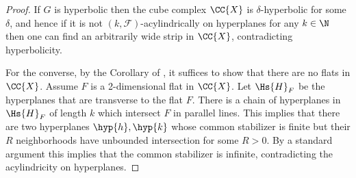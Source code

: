 \begin{proof}
	If $G$ is hyperbolic then the cube complex $\CC{X}$ is $\delta$-hyperbolic for some $\delta$, and hence if it is not $(k,\mathcal{F})$-acylindrically on hyperplanes for any $k\in\N$ then one can find an arbitrarily wide strip in $\CC{X}$, contradicting hyperbolicity.
	
	For the converse, by the Corollary of \cite{Bri95}, it suffices to show that there are no flats in $\CC{X}$. Assume $F$ is a 2-dimensional flat in $\CC{X}$. Let $\Hs{H}_F$ be the hyperplanes that are transverse to the flat $F$. There is a chain of hyperplanes in $\Hs{H}_F$ of length $k$ which intersect $F$ in parallel lines. This implies that there are two hyperplanes $\hyp{h},\hyp{k}$ whose common stabilizer is finite but their $R$ neighborhoods have unbounded intersection for some $R>0$. By a standard argument this implies that the common stabilizer is infinite, contradicting the acylindricity on hyperplanes.
\end{proof}

%


